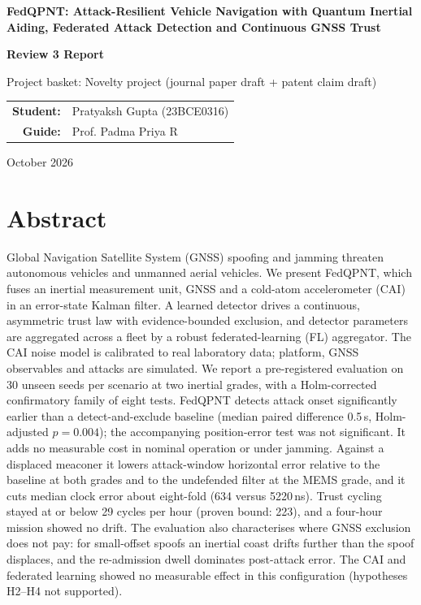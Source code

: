 \documentclass[12pt,a4paper]{article}
\begin{document}
\begin{titlepage}
\centering
\vspace*{1.5cm}
{\LARGE\bfseries FedQPNT: Attack-Resilient Vehicle Navigation with Quantum Inertial Aiding, Federated Attack Detection and Continuous GNSS Trust\par}
\vspace{1.5cm}
{\Large\bfseries Review 3 Report\par}
\vspace{1.5cm}
{\large Project basket: Novelty project (journal paper draft + patent claim draft)\par}
\vspace{2cm}
\begin{tabular}{rl}
\textbf{Student:} & Pratyaksh Gupta (23BCE0316)\\[6pt]
\textbf{Guide:} & Prof. Padma Priya R
\end{tabular}
\vfill
{\large October 2026\par}
\end{titlepage}

\section*{Abstract}
Global Navigation Satellite System (GNSS) spoofing and jamming threaten autonomous vehicles and unmanned aerial vehicles. We present FedQPNT, which fuses an inertial measurement unit, GNSS and a cold-atom accelerometer (CAI) in an error-state Kalman filter. A learned detector drives a continuous, asymmetric trust law with evidence-bounded exclusion, and detector parameters are aggregated across a fleet by a robust federated-learning (FL) aggregator. The CAI noise model is calibrated to real laboratory data; platform, GNSS observables and attacks are simulated. We report a pre-registered evaluation on 30 unseen seeds per scenario at two inertial grades, with a Holm-corrected confirmatory family of eight tests. FedQPNT detects attack onset significantly earlier than a detect-and-exclude baseline (median paired difference 0.5\,s, Holm-adjusted $p=0.004$); the accompanying position-error test was not significant. It adds no measurable cost in nominal operation or under jamming. Against a displaced meaconer it lowers attack-window horizontal error relative to the baseline at both grades and to the undefended filter at the MEMS grade, and it cuts median clock error about eight-fold (634 versus 5220\,ns). Trust cycling stayed at or below 29 cycles per hour (proven bound: 223), and a four-hour mission showed no drift. The evaluation also characterises where GNSS exclusion does not pay: for small-offset spoofs an inertial coast drifts further than the spoof displaces, and the re-admission dwell dominates post-attack error. The CAI and federated learning showed no measurable effect in this configuration (hypotheses H2--H4 not supported).
\end{document}
